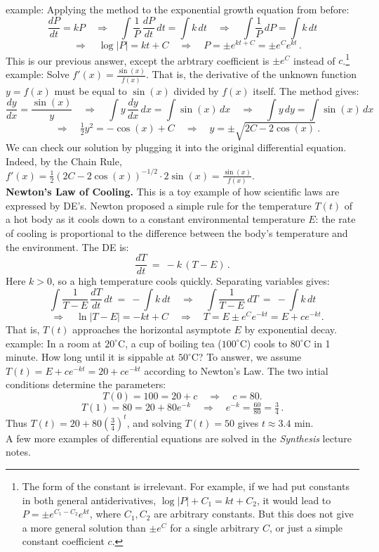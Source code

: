 \documentclass[11pt]{article}
\begin{document}
\noindent
{\sc example:} Applying the method to the exponential growth equation from before:
$$
\frac{dP}{dt} = kP
\quad\Longrightarrow\quad
\int \frac{1}{P}\, \frac{dP}{dt}\,dt = \int k\,dt
\quad\Longrightarrow\quad
\int \frac{1}{P}\, dP = \int k\,dt
$$
$$
\quad\Longrightarrow\quad
\log\!|P| = kt + C
\quad\Longrightarrow\quad
P = \pm e^{kt+C} = \pm e^Ce^{kt}\,.
$$
This is  our previous answer, except the arbtrary coefficient is $\pm e^C$ instead of $c$.\footnote{
The form of the constant is irrelevant. For example, if we had put constants in both general antiderivatives, $\log|P|+C_1=kt + C_2$, it would lead to $P= \pm e^{C_1-C_2} e^{kt}$, where $C_1,C_2$ are arbitrary constants. But this does not give a more general solution than $\pm e^C$ for a single arbitrary $C$, or just a simple constant coefficient $c$.}
\\[.5em]
{\sc example:} Solve
$f'(x) = \frac{\sin(x)}{f(x)}$. That is, the derivative of the unknown function $y=f(x)$ 
must be equal to $\sin(x)$ divided by $f(x)$ itself. The method gives:
$$
\frac{dy}{dx} = \frac{\sin(x)}{y}
\quad\Longrightarrow\quad
\int y\,\frac{dy}{dx}\,dx = \int\sin(x)\,dx
\quad\Longrightarrow\quad
\int y\, dy = \int\sin(x)\,dx
$$
$$
\quad\Longrightarrow\quad
\tfrac12 y^2 = -{\cos(x)} + C
\quad\Longrightarrow\quad
y = \pm\sqrt{2C {-} 2\cos(x)}\,.
$$
We can check our solution by plugging it into the original differential equation.
Indeed, by the Chain Rule, $f'(x) = \frac12(2C{-}2\cos(x))^{-1/2}\cdot 2\sin(x)= \frac{\sin(x)}{f(x)}$.
\\[1.5em]
{\bf Newton's Law of Cooling.} This is a toy example of how scientific laws are expressed by DE's.  Newton proposed a simple rule for the temperature $T(t)$ of a hot body as it cools down to a constant environmental temperature $E$: 
the rate of cooling is proportional to the difference between the body's temperature
and the environment. The DE is:
$$
\frac{dT}{dt} \ =\ -k\,(T{-}E)\,.
$$
Here $k>0$, so  a high temperature cools quickly.
Separating variables gives:
$$
\int \!\frac{1}{T{-}E}\,\frac{dT}{dt} \, dt \ = \ -\int\! k\,dt
\quad\Longrightarrow\quad
\int \!\frac{1}{T{-}E}\ dT \ = \ -\int\! k\,dt
$$
$$
\quad\Longrightarrow\quad
\ln\!|T{-}E| = -kt+C
\quad\Longrightarrow\quad
T = E\pm e^Ce^{-kt}
=E+ ce^{-kt}.
$$
That is, $T(t)$ approaches the horizontal asymptote $E$ by exponential decay.
\\[.5em]
{\sc example:} In a room at $20^\circ$C, a cup of boiling tea ($100^\circ$C) cools to $80^\circ$C in 1 minute. 
How long until it is sippable at $50^\circ$C? 
To answer, we assume $T(t)=E+ce^{-kt}=20 + ce^{-kt}$ according to Newton's Law. 
The two intial conditions determine the parameters:
$$
T(0) = 100 = 20+c\quad\Longrightarrow\quad c = 80.
$$
$$
T(1) = 80 = 20 + 80e^{-k}\quad\Longrightarrow\quad
e^{-k} = \tfrac{60}{80} =\tfrac34\,.
$$
Thus $T(t)=20 + 80\!\left(\tfrac34\right)^{\!t}$, and solving $T(t)=50$ gives $t\approx 3.4$ min.
\\[1em]
A few more examples of differential equations are solved in the \emph{Synthesis} lecture notes.
\end{document}
